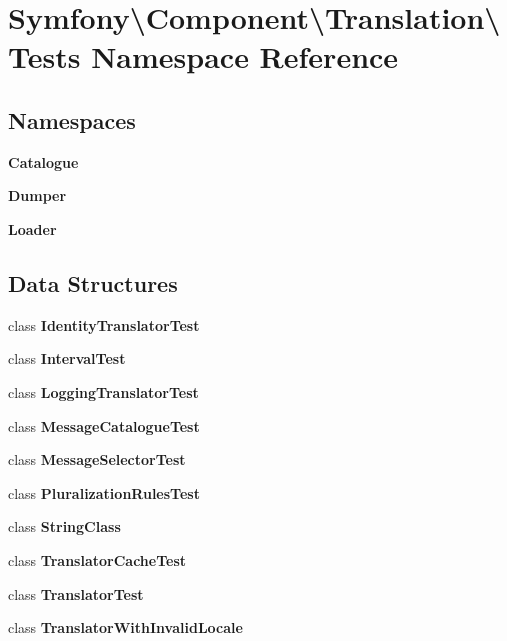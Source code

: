 \section{Symfony\textbackslash{}Component\textbackslash{}Translation\textbackslash{}Tests Namespace Reference}
\label{namespace_symfony_1_1_component_1_1_translation_1_1_tests}
\subsection*{Namespaces}
\begin{DoxyCompactItemize}
\item 
 {\bf Catalogue}
\item 
 {\bf Dumper}
\item 
 {\bf Loader}
\end{DoxyCompactItemize}
\subsection*{Data Structures}
\begin{DoxyCompactItemize}
\item 
class {\bf Identity\+Translator\+Test}
\item 
class {\bf Interval\+Test}
\item 
class {\bf Logging\+Translator\+Test}
\item 
class {\bf Message\+Catalogue\+Test}
\item 
class {\bf Message\+Selector\+Test}
\item 
class {\bf Pluralization\+Rules\+Test}
\item 
class {\bf String\+Class}
\item 
class {\bf Translator\+Cache\+Test}
\item 
class {\bf Translator\+Test}
\item 
class {\bf Translator\+With\+Invalid\+Locale}
\end{DoxyCompactItemize}
